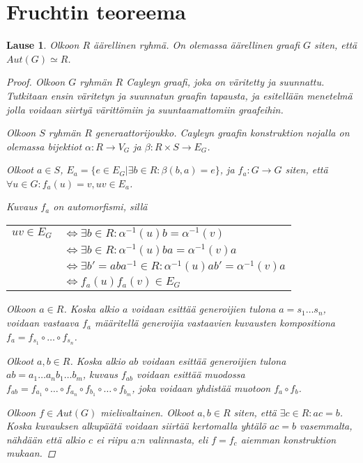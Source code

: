 \documentclass[a4paper, 12pt]{article}
\theoremstyle{definition}
\theoremstyle{plain}
\newtheorem{teor}[mydef]{Lause}
\begin{document}
\newpage

\section{Fruchtin teoreema}

\begin{teor}
Olkoon $R$ äärellinen ryhmä. On olemassa äärellinen graafi $G$ siten, että $Aut(G) \simeq R$.
\begin{proof}

Olkoon $G$ ryhmän $R$ Cayleyn graafi, joka on väritetty ja suunnattu. Tutkitaan ensin väritetyn ja suunnatun graafin tapausta, ja esitellään menetelmä jolla voidaan siirtyä värittömiin ja suuntaamattomiin graafeihin.

Olkoon $S$ ryhmän $R$ generaattorijoukko. Cayleyn graafin konstruktion nojalla on olemassa bijektiot $\alpha: R \rightarrow V_G$ ja $\beta: R \times S \rightarrow E_G$. 

Olkoot $a \in S$, $E_a = \{e \in E_G | \exists b \in R: \beta(b, a) = e\}$, ja $f_a: G \rightarrow G$ siten, että $\forall u \in G: f_a(u) = v, uv \in E_a$. 

Kuvaus $f_a$ on automorfismi, sillä
\begin{center}
\begin{tabular}{r l}
$uv \in E_G$ & $\Leftrightarrow \exists b \in R: \alpha^{-1}(u)b = \alpha^{-1}(v)$ \\
& $\Leftrightarrow \exists b \in R: \alpha^{-1}(u)ba = \alpha^{-1}(v)a$ \\
& $\Leftrightarrow \exists b' = aba^{-1} \in R: \alpha^{-1}(u)ab' = \alpha^{-1}(v)a$ \\
& $\Leftrightarrow f_a(u)f_a(v) \in E_G$\\
\end{tabular}
\end{center}

Olkoon $a \in R$. Koska alkio $a$ voidaan esittää generoijien tulona $a = s_1 \dots s_n$, voidaan vastaava $f_a$ määritellä generoijia vastaavien kuvausten kompositiona $f_a = f_{s_1} \circ \dots \circ f_{s_n}$.

Olkoot $a, b \in R$. Koska alkio $ab$ voidaan esittää generoijien tulona $ab = a_1 \dots a_n b_1 \dots b_m$, kuvaus $f_{ab}$ voidaan esittää muodossa $f_{ab} = f_{a_1} \circ \dots \circ f_{a_n} \circ f_{b_1} \circ \dots \circ f_{b_m}$, joka voidaan yhdistää muotoon $f_a \circ f_b$.

Olkoon $f \in Aut(G)$ mielivaltainen. Olkoot $a, b \in R$ siten, että $\exists c \in R: ac = b$. Koska kuvauksen alkupäätä voidaan siirtää kertomalla yhtälö $ac = b$ vasemmalta, nähdään että alkio $c$ ei riipu $a$:n valinnasta, eli $f = f_c$ aiemman konstruktion mukaan.


\end{proof}
\end{teor}
\end{document}
